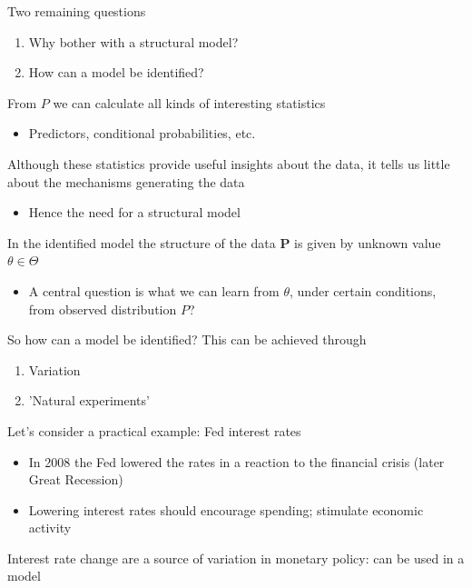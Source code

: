 \documentclass{beamer}
\begin{document}
\begin{frame}
  Two remaining questions
  \begin{enumerate}
    \item Why bother with a structural model?
    \item How can a model be identified?
  \end{enumerate}
\end{frame}

\begin{frame}
 From $P$ we can calculate all kinds of interesting statistics
 \begin{itemize}
   \item Predictors, conditional probabilities, etc.
 \end{itemize}
 \medskip
 Although these statistics provide useful insights about the data, it tells us little about the mechanisms generating the data
 \begin{itemize}
   \item Hence the need for a structural model
 \end{itemize}
 \medskip
 In the identified model the structure of the data $\mathbf{P}$ is given by unknown value $\theta \in \Theta$
 \begin{itemize}
   \item A central question is what we can learn from $\theta$, under certain conditions, from observed distribution $P$?
 \end{itemize}
\end{frame}

\begin{frame}
 So how can a model be identified?
 This can be achieved through
 \begin{enumerate}
    \item Variation
    \item 'Natural experiments'
  \end{enumerate}
\end{frame}

\begin{frame}
 Let's consider a practical example: Fed interest rates
 \begin{itemize}
   \item In 2008 the Fed lowered the rates in a reaction to the financial crisis (later Great Recession)
   \item Lowering interest rates should encourage spending; stimulate economic activity
 \end{itemize}
 \medskip
 Interest rate change are a source of variation in monetary policy: can be used in a model  
\end{frame}
\end{document}
